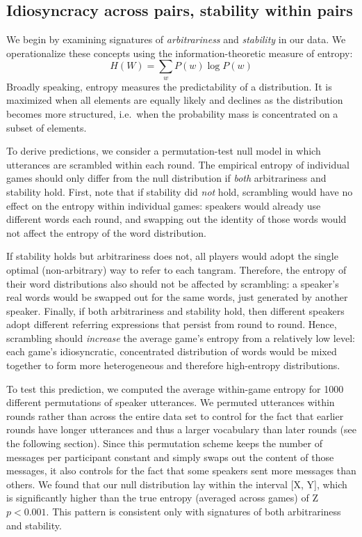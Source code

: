 \documentclass[alpha-refs]{wiley-article}
\begin{document}
\subsection{Idiosyncracy across pairs, stability within pairs}
\label{arbitrariness-and-stability}

We begin by examining signatures of \emph{arbitrariness} and
\emph{stability} in our data. We operationalize these concepts using the
information-theoretic measure of entropy:
\[H(W) = \sum_w P(w) \log P(w)\] Broadly speaking, entropy measures the
predictability of a distribution. It is maximized when all elements are
equally likely and declines as the distribution becomes more structured,
i.e.~when the probability mass is concentrated on a subset of elements.

To derive predictions, we consider a permutation-test null model in
which utterances are scrambled within each round. The empirical entropy
of individual games should only differ from the null distribution if
\emph{both} arbitrariness and stability hold. First, note that if
stability did \emph{not} hold, scrambling would have no effect on the
entropy within individual games: speakers would already use different
words each round, and swapping out the identity of those words would not
affect the entropy of the word distribution.

If stability holds but arbitrariness does not, all players would adopt
the single optimal (non-arbitrary) way to refer to each tangram.
Therefore, the entropy of their word distributions also should not be
affected by scrambling: a speaker's real words would be swapped out for
the same words, just generated by another speaker. Finally, if both
arbitrariness and stability hold, then different speakers adopt
different referring expressions that persist from round to round. Hence,
scrambling should \emph{increase} the average game's entropy from a
relatively low level: each game's idiosyncratic, concentrated
distribution of words would be mixed together to form more heterogeneous
and therefore high-entropy distributions.

To test this prediction, we computed the average within-game entropy for
1000 different permutations of speaker utterances. We permuted
utterances within rounds rather than across the entire data set to
control for the fact that earlier rounds have longer utterances and thus
a larger vocabulary than later rounds (see the following section). Since
this permutation scheme keeps the number of messages per participant
constant and simply swaps out the content of those messages, it also
controls for the fact that some speakers sent more messages than others.
We found that our null distribution lay within the interval {[}X, Y{]},
which is significantly higher than the true entropy (averaged across
games) of Z \(p < 0.001\). This pattern is consistent only with
signatures of both arbitrariness and stability.
\end{document}

